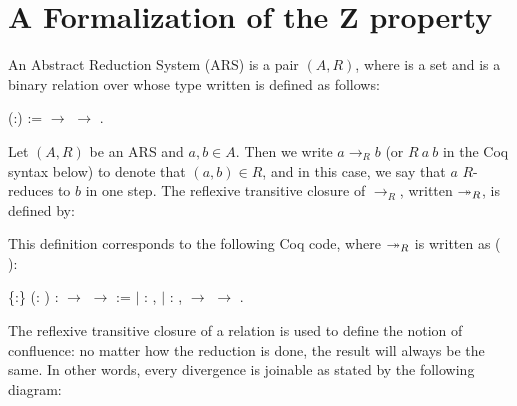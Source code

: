 \begin{coqdoccode}
\end{coqdoccode}
\section{A Formalization of the Z property}


\begin{coqdoccode}
\end{coqdoccode}
An Abstract Reduction System (ARS) is a pair $(A,R)$, where  is a set and  is a binary relation over  whose type written   is defined as follows: 
\begin{coqdoccode}
\coqdocemptyline
\coqdocnoindent
{}  (:) :=  \ensuremath{\rightarrow}  \ensuremath{\rightarrow} .\coqdoceol
\coqdocemptyline
\end{coqdoccode}
Let $(A,R)$ be an ARS and $a,b\in A$. Then we write $a\to_R b$ (or $R\ a\ b$ in the Coq syntax below) to denote that $(a,b)\in R$, and in this case, we say that $a$ $R$-reduces to $b$ in one step. The reflexive transitive closure of $\to_R$, written $\twoheadrightarrow_R$, is defined by:




 This definition corresponds to the following Coq code, where $\twoheadrightarrow_R$ is written as ( ): 
\begin{coqdoccode}
\coqdocemptyline
\coqdocnoindent
{}  \{:\} (:  ) :  \ensuremath{\rightarrow}  \ensuremath{\rightarrow}  :=\coqdoceol
\coqdocnoindent
\ensuremath{|} : \coqdockw{\ensuremath{\forall}} ,    \coqdoceol
\coqdocnoindent
\ensuremath{|} : \coqdockw{\ensuremath{\forall}}   ,    \ensuremath{\rightarrow}     \ensuremath{\rightarrow}    .\coqdoceol
\end{coqdoccode}
The reflexive transitive closure of a relation is used to define
    the notion of confluence: no matter how the reduction is done, the
    result will always be the same. In other words, every divergence
    is joinable as stated by the following diagram:


